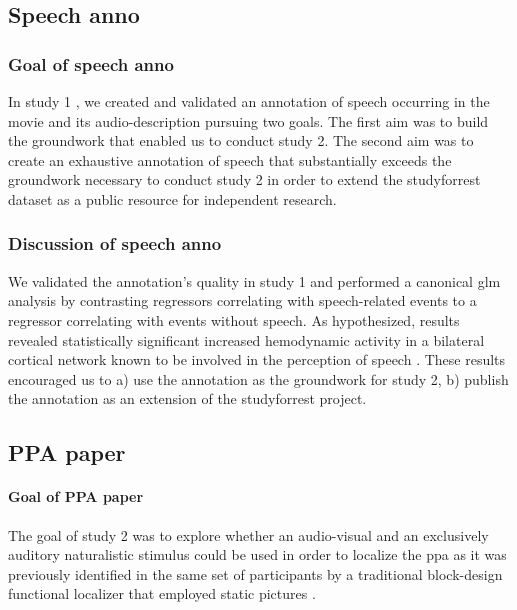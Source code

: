 



\subsection{Speech anno}


\subsubsection{Goal of speech anno}

In study 1 \citep{haeusler2021speechanno}, we created and validated an
annotation of speech occurring in the movie and its audio-description pursuing
two goals.
The first aim was to build the groundwork that enabled us to conduct study 2.
The second aim was to create an exhaustive annotation of speech that
substantially exceeds the groundwork necessary to conduct study 2 in order to
extend the studyforrest dataset as a public resource for independent research.


\subsubsection{Discussion of speech anno}

We validated the annotation's quality in study 1 and performed a canonical
\ac{glm} analysis by contrasting regressors correlating with speech-related
events to a regressor correlating with events without speech.
As hypothesized, results revealed statistically significant increased
hemodynamic activity in a bilateral cortical network known to be involved in the
perception of speech \citep[e.g.,][]{friederici2011brain, wilson2008beyond}.
These results encouraged us to a) use the annotation as the groundwork for study
2, b) publish the annotation as an extension of the studyforrest project.


\subsection{PPA paper}

\paragraph{Goal of PPA paper}
The goal of study 2 \citep{haeusler2022processing} was to explore whether an
audio-visual and an exclusively auditory naturalistic stimulus could be used in
order to localize the \ac{ppa} as it was previously identified in the same set
of participants by a traditional block-design functional localizer that employed
static pictures \citep{sengupta2016extension}.


